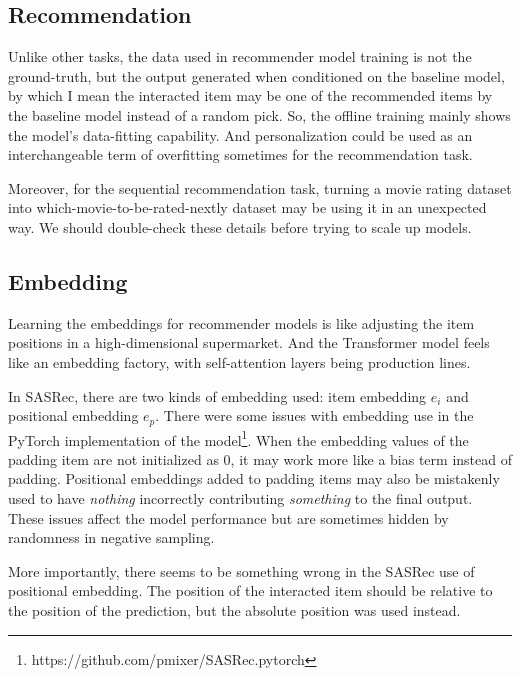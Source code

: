 \documentclass{article}
\begin{document}
\subsection{Recommendation}

Unlike other tasks, the data used in recommender model training is not the
ground-truth, but the output generated when conditioned on the baseline model, by which I mean the interacted item may be one of the recommended items by the baseline model instead of a random pick. So, the offline training mainly shows the model's data-fitting capability.
And personalization could be used as an interchangeable term of overfitting sometimes for the recommendation task. 

Moreover, for the sequential recommendation task, turning a movie rating dataset into which-movie-to-be-rated-nextly dataset may be using it in an unexpected way. We should double-check these details before trying to scale up models.


\subsection{Embedding}


Learning the embeddings for recommender models is like adjusting the item positions in a high-dimensional supermarket.
And the Transformer\cite{transformer} model feels like an embedding factory, with self-attention layers being production lines.

In SASRec\cite{sasrec}, there are two kinds of embedding used: item embedding $e_i$ and positional embedding $e_p$.
There were some issues with embedding use in the PyTorch implementation of the model\footnote{https://github.com/pmixer/SASRec.pytorch}.
When the embedding values of the padding item are not initialized as $0$, it may work more like a bias term instead of padding.
Positional embeddings added to padding items may also be mistakenly used to have \emph{nothing} incorrectly contributing \emph{something} to the final output.
These issues affect the model performance but are sometimes hidden by randomness in negative sampling.

More importantly, there seems to be something wrong in the SASRec\cite{sasrec} use of positional embedding.
The position of the interacted item should be relative to the position of the prediction, but the absolute position was used instead.
\end{document}
